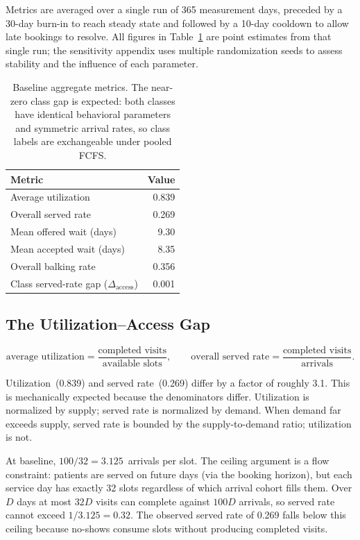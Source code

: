\documentclass[11pt]{article}
\begin{document}
Metrics are averaged over a single run of 365 measurement days,
preceded by a 30-day burn-in to reach steady state and followed by a
10-day cooldown to allow late bookings to resolve. All figures in
Table~\ref{tab:baseline} are point estimates from that single run; the
sensitivity appendix uses multiple randomization seeds to assess stability and the influence of each parameter.

\begin{table}[H]
\centering
\renewcommand{\arraystretch}{1.15}
\begin{tabular}{lr}
\toprule
Metric & Value \\
\midrule
Average utilization & 0.839 \\
Overall served rate & 0.269 \\
Mean offered wait (days) & 9.30 \\
Mean accepted wait (days) & 8.35 \\
Overall balking rate & 0.356 \\
Class served-rate gap ($\Delta_{\text{access}}$) & 0.001 \\
\bottomrule
\end{tabular}
\caption{Baseline aggregate metrics. The near-zero class gap is expected:
both classes have identical behavioral parameters and symmetric arrival rates,
so class labels are exchangeable under pooled FCFS.}
\label{tab:baseline}
\end{table}

\subsection{The Utilization--Access Gap}

\[
  \text{average utilization}
  = \frac{\text{completed visits}}{\text{available slots}},
  \qquad
  \text{overall served rate}
  = \frac{\text{completed visits}}{\text{arrivals}}.
\]

Utilization~(0.839) and served rate~(0.269) differ by a factor of roughly
3.1. This is mechanically expected because the denominators differ.
Utilization is normalized by supply; served rate is normalized by demand.
When demand far exceeds supply, served rate is bounded by the
supply-to-demand ratio; utilization is not.

At baseline, $100/32 = 3.125$~arrivals per slot. The ceiling argument is
a flow constraint: patients are served on future days (via the booking
horizon), but each service day has exactly 32 slots regardless of which
arrival cohort fills them. Over $D$ days at most $32D$ visits can complete
against $100D$ arrivals, so served rate cannot exceed $1/3.125 = 0.32$.
The observed served rate of 0.269 falls below this ceiling because
no-shows consume slots without producing completed visits.
\end{document}
